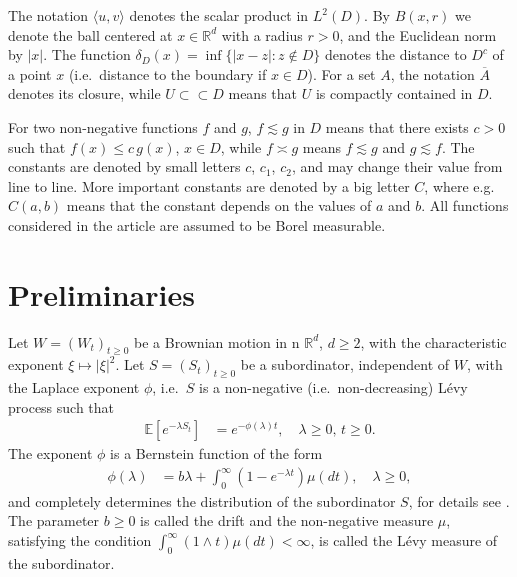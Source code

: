 \documentclass[12pt,a4paper,onecolumn]{article}
\theoremstyle{definition}
\newcommand{\R}{\mathbb{R}}
\newcommand{\ex}{\mathds{E}}
\newcommand{\subsub}{\subset\subset}
\newcommand{\1}{\mathbf 1}
\newcommand{\de}{\delta_D}
\newcommand{\la}{\langle}
\newcommand{\ra}{\rangle}
\numberwithin{equation}{section}
\begin{document}
        The notation $\la u,v\ra$ denotes the scalar product in $L^2(D)$. By $B(x,r)$ we denote the ball centered at $x\in \R^d$ with a radius $r>0$, and the Euclidean norm by $|x|$. The function $\de(x)=\inf\{|x-z|:z\notin D\}$ denotes the distance to $D^c$ of a point $x$ (i.e.~distance to the boundary if $x\in D$). For a set $A$, the notation $\overline A$ denotes its closure, while $U\subsub D$ means that $U$ is compactly contained in $D$.
		
        For two non-negative functions $f$ and $g$, $f \lesssim g$ in $D$ means that there exists $c>0$ such that $f(x)\le c\,g(x)$, $x\in D$, while $f\asymp g$ means $f\lesssim g$ and $g\lesssim f$. The constants are denoted by small letters $c$, $c_1$, $c_2$, and may change their value from line to line. More important constants are denoted by a big letter $C$, where e.g. $C(a,b)$ means that the constant depends on the values of $a$ and $b$. All functions considered in the article are assumed to be Borel measurable.
    
	\section{Preliminaries}\label{s:prelim}
	
	Let $W=(W_t)_{t\ge 0}$ be a Brownian motion in n $\R^d$, $d\ge2$, with the characteristic exponent $\xi\mapsto |\xi|^2$. Let $S=(S_t)_{t\ge 0}$ be a subordinator, independent of $W$, with the Laplace exponent $\phi$, i.e.~$S$ is a non-negative (i.e.~non-decreasing) L\'evy process such that
    \begin{align*}
        \ex\left[e^{-\lambda S_t}\right]&=e^{-\phi(\lambda)t},\quad \lambda\ge 0,\,t\ge 0.
    \end{align*}
    The exponent $\phi$ is a Bernstein function of the form
    \begin{align*}
        \phi(\lambda)&=b\lambda +\int_0^\infty (1-e^{-\lambda t})\mu(dt),\quad \lambda\ge 0,
    \end{align*}
    and completely determines the distribution of the subordinator $S$, for details see \cite{bernstein}. The parameter $b\ge 0$ is called the drift and the non-negative measure $\mu$, satisfying the condition $\int_0^\infty (1\wedge t)\mu(dt)<\infty$, is called the L\'evy measure of the subordinator.
\end{document}
